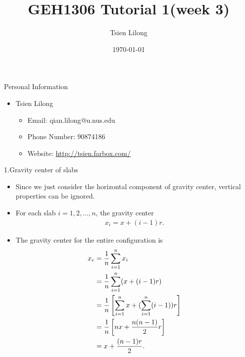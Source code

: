 \documentclass{beamer}
\author{Tsien Lilong}
\title{GEH1306 Tutorial 1(week 3)}
\date{\today}
\begin{document}
\titlepageframe


\begin{tframe}{Personal Information}
  \begin{itemize}
    \item Tsien Lilong
          \begin{itemize}
            \item Email: qian.lilong@u.nus.edu
            \item Phone Number: 90874186
            \item Website: \url{http://tsien.farbox.com/}
          \end{itemize}
  \end{itemize}
\end{tframe}

\begin{frame}{1.Gravity center of slabs}
 
  \begin{figure}[H]
    \centering
    \label{fig:fig001}
  \end{figure}
  \begin{itemize}
    \item
          Since we just consider the horizontal component of gravity center, vertical properties can be ignored.
    \item 
          For each slab $i=1,2,\ldots,n$, the gravity center
          \begin{align}
            x_i=x+(i-1)r.
          \end{align}

    \item
          The gravity center for the entire configuration is
          \begin{align*}
            x_{c}&=\frac{1}{n}\sum_{i=1}^{n}x_i\\
                 &={1\over n} \sum_{i=1}^n(x+(i-1)r)\\
                 &={1\over n} \left[\sum_{i=1}^n x+ (\sum_{i=1}^n(i-1) )r\right]\\
                 &={1\over n} \left[nx+ {n(n-1)\over 2}r\right]\\
                 &=x+{(n-1)r\over2}.
          \end{align*}

  \end{itemize}

  
\end{frame}
\end{document}

